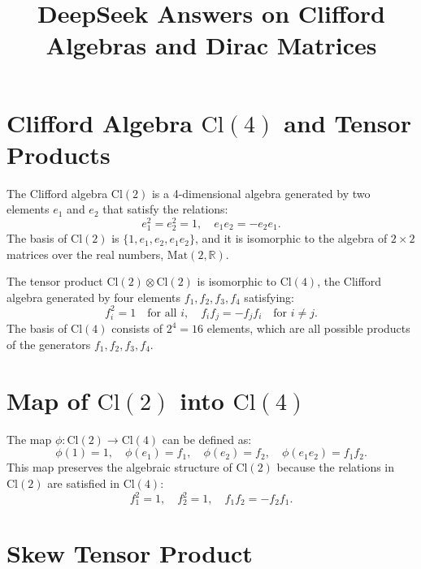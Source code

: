 \documentclass{article}
\begin{document}
\title{DeepSeek Answers on Clifford Algebras and Dirac Matrices}
\author{}
\date{}
\maketitle

\section*{Clifford Algebra $\text{Cl}(4)$ and Tensor Products}

The Clifford algebra $\text{Cl}(2)$ is a 4-dimensional algebra generated by
two elements $e_1$ and $e_2$ that satisfy the relations: 
\begin{equation*}
e_1^2 = e_2^2 = 1, \quad e_1 e_2 = -e_2 e_1. 
\end{equation*}
The basis of $\text{Cl}(2)$ is $\{1, e_1, e_2, e_1 e_2\}$, and it is
isomorphic to the algebra of $2 \times 2$ matrices over the real numbers, $%
\text{Mat}(2, \mathbb{R})$.

The tensor product $\text{Cl}(2) \otimes \text{Cl}(2)$ is isomorphic to $%
\text{Cl}(4)$, the Clifford algebra generated by four elements $f_1, f_2,
f_3, f_4$ satisfying: 
\begin{equation*}
f_i^2 = 1 \quad \text{for all } i, \quad f_i f_j = -f_j f_i \quad \text{for }
i \neq j. 
\end{equation*}
The basis of $\text{Cl}(4)$ consists of $2^4 = 16$ elements, which are all
possible products of the generators $f_1, f_2, f_3, f_4$.

\section*{Map of $\text{Cl}(2)$ into $\text{Cl}(4)$}

The map $\phi: \text{Cl}(2) \to \text{Cl}(4)$ can be defined as: 
\begin{equation*}
\phi(1) = 1, \quad \phi(e_1) = f_1, \quad \phi(e_2) = f_2, \quad \phi(e_1
e_2) = f_1 f_2. 
\end{equation*}
This map preserves the algebraic structure of $\text{Cl}(2)$ because the
relations in $\text{Cl}(2)$ are satisfied in $\text{Cl}(4)$: 
\begin{equation*}
f_1^2 = 1, \quad f_2^2 = 1, \quad f_1 f_2 = -f_2 f_1. 
\end{equation*}

\section*{Skew Tensor Product}
\end{document}
